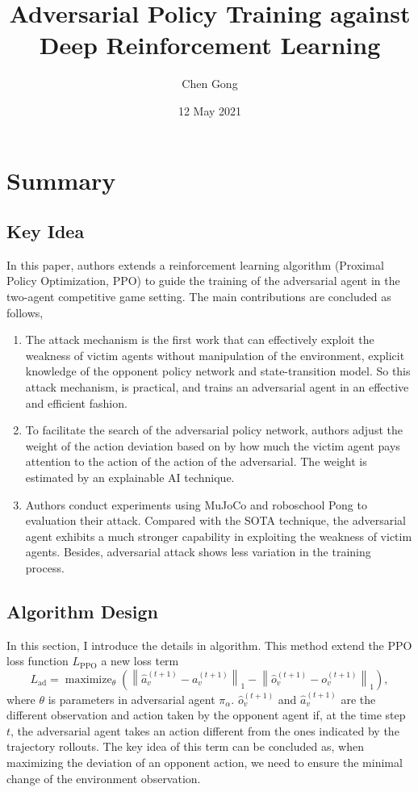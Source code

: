 \documentclass[a4paper]{article}
\title{Adversarial Policy Training against Deep Reinforcement Learning}
\author{Chen Gong}
\date{12 May 2021}
\begin{document}
\maketitle

\section{Summary}
\subsection{Key Idea}
In this paper, authors extends a reinforcement learning algorithm (Proximal Policy Optimization, PPO) to guide the training of the adversarial agent in the two-agent competitive game setting.
The main contributions are concluded as follows,
\begin{enumerate}
    \item The attack mechanism is the first work that can effectively exploit the weakness of victim agents without manipulation of the environment, explicit knowledge of the opponent policy network and state-transition model.
    So this attack mechanism, is practical, and trains an adversarial agent in an effective and efficient fashion. 
    \item To facilitate the search of the adversarial policy network, 
    authors adjust the weight of the action deviation based on by how much the victim agent pays attention to the action of the action of the adversarial.
    The weight is estimated by an explainable AI technique.
    \item Authors conduct experiments using MuJoCo and roboschool Pong to evaluation their attack. Compared with the SOTA technique,
    the adversarial agent exhibits a much stronger capability in exploiting the weakness of victim agents. 
    Besides, adversarial attack shows less variation in the training process.
\end{enumerate}



\subsection{Algorithm Design}
In this section, I introduce the details in algorithm. This method extend the PPO loss function $L_\text{PPO}$ a new loss term
\begin{equation}
    L_\text{ad}=\operatorname{maximize}_{\theta}\left(\left\|\hat{a}_{v}^{(t+1)}-a_{v}^{(t+1)}\right\|_{1}-\left\|\hat{o}_{v}^{(t+1)}-o_{v}^{(t+1)}\right\|_{1}\right),
\end{equation}
where $\theta$ is parameters in adversarial agent $\pi_\alpha$.
$\hat{o}_v^{(t+1)}$ and $\hat{a}_v^{(t+1)}$ are the different observation and action taken by the opponent agent if, 
at the time step $t$, the adversarial agent takes an action different from the ones indicated by the trajectory rollouts.
The key idea of this term can be concluded as, 
when maximizing the deviation of an opponent action,
we need to ensure the minimal change of the environment observation. 
\end{document}
